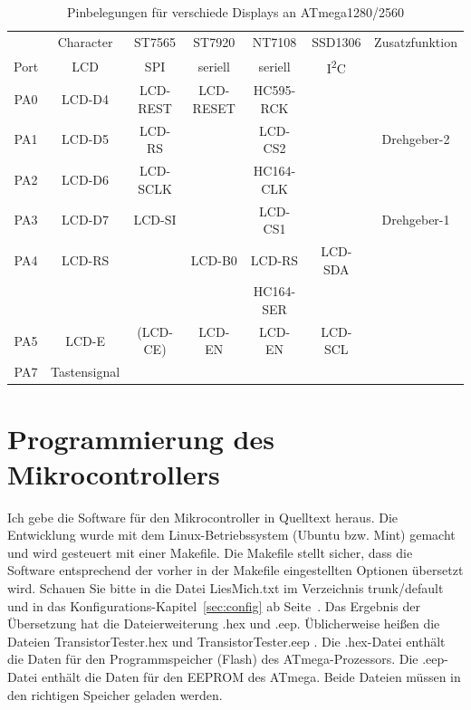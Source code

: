 \begin{table}[H]
  \begin{center}
    \begin{tabular}{| c || c | c | c | c | c | c |}
    \hline
           & Character     &  ST7565     & ST7920       & NT7108       & SSD1306     & Zusatzfunktion \\
      Port & LCD           &    SPI      & seriell      & seriell      &    I\textsuperscript{2}C      & \\
    \hline
    \hline
    PA0    &  LCD-D4       &   LCD-REST  &  LCD-RESET   & HC595-RCK       &             & \\
    \hline
    PA1    &  LCD-D5       &   LCD-RS    &              & LCD-CS2        &             & Drehgeber-2 \\
    \hline
    PA2    &  LCD-D6       &   LCD-SCLK  &              & HC164-CLK      &             & \\
    \hline
    PA3    &  LCD-D7       &   LCD-SI    &              & LCD-CS1        &             & Drehgeber-1 \\
    \hline
    PA4    &  LCD-RS       &             &   LCD-B0     & LCD-RS         &   LCD-SDA   & \\
           &               &             &              & HC164-SER      &             & \\
    \hline
    PA5    &  LCD-E        &  (LCD-CE)   &   LCD-EN     & LCD-EN         &   LCD-SCL  & \\
    \hline
    PA7    &  Tastensignal &             &              &                &             & \\
    \hline
    \end{tabular}
  \end{center}
  \caption{Pinbelegungen für verschiede Displays an ATmega1280/2560}
  \label{tab:display-1280}
\end{table}


\section{Programmierung des Mikrocontrollers}
Ich gebe die Software für den Mikrocontroller in Quelltext heraus.
Die Entwicklung wurde mit dem Linux-Betriebssystem (Ubuntu bzw. Mint) gemacht
und wird gesteuert mit einer Makefile.
Die Makefile stellt sicher, dass die Software entsprechend der vorher in der Makefile 
eingestellten Optionen übersetzt wird. Schauen Sie bitte in die Datei LiesMich.txt
im Verzeichnis trunk/default und in das Konfigurations-Kapitel~\ref{sec:config} ab Seite~\pageref{sec:config}.
Das Ergebnis der Übersetzung hat die Dateierweiterung .hex und .eep.
Üblicherweise heißen die Dateien TransistorTester.hex und TransistorTester.eep .
Die .hex-Datei enthält die Daten für den Programmspeicher (Flash) des ATmega-Prozessors.
Die .eep-Datei enthält die Daten für den EEPROM des ATmega.
Beide Dateien müssen in den richtigen Speicher geladen werden.

